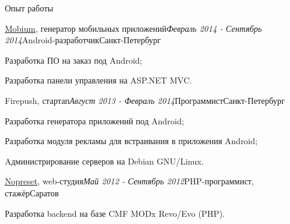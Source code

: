 \documentclass[hidelinks]{resume} %
\begin{document}
\begin{rSection}{Опыт работы}

\begin{rSubsection}{\href{http://mobiumapps.com}{Mobium}, генератор мобильных приложений}{\em Февраль 2014 - Сентябрь
2014}{Android-разработчик}{Санкт-Петербург}
\item Разработка ПО на заказ под Android;
\item Разработка панели управления на ASP.NET MVC.
\end{rSubsection}


\begin{rSubsection}{Firepush, стартап}{\em Август 2013 - Февраль 2014}{Программист}{Санкт-Петербург}
\item Разработка генератора приложений под Android;
\item Разработка модуля рекламы для встраивания в приложения Android;
\item Aдминистрирование серверов на Debian GNU/Linux.
\end{rSubsection}


\begin{rSubsection}{\href{http://nopreset.ru}{Nopreset}, web-студия}{\em Май 2012 - Сентябрь 2012}{PHP-программист, стажёр}{Саратов}
\item Разработка backend на базе CMF MODx Revo/Evo (PHP).
\end{rSubsection}
\end{rSection}

\end{document}
